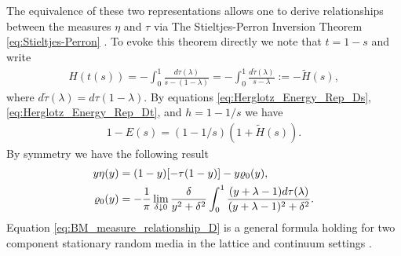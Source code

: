 \documentclass[english,12pt]{ttuthes}
\begin{document}
The equivalence of these two representations allows one to derive
relationships between the measures $\eta$ and $\tau$ via The Stieltjes-Perron
Inversion Theorem \eqref{eq:Stieltjes-Perron}
\cite{Day:JPCM-96,Henrici:1974:v3,MILTON:2002:TC}.
To evoke this theorem directly we note that $t=1-s$ and write
%
\begin{align}\label{eq:Hts}
  H(t(s))=-\int_0^1\frac{d\tau(\lambda)}{s-(1-\lambda)}
         =-\int_0^1\frac{d\tilde{\tau}(\lambda)}{s-\lambda}
         :=-\tilde{H}(s),
\end{align}
%
where $d\tilde{\tau}(\lambda)=d\tau(1-\lambda)$. By equations
\eqref{eq:Herglotz_Energy_Rep_Ds}, \eqref{eq:Herglotz_Energy_Rep_Dt},
and $h=1-1/s$ we have  
%
\begin{align}\label{eq:Es_relationships_D}
  1-E(s)=(1-1/s)(1+\tilde{H}(s)).
\end{align}
%
By symmetry we have the following result
%
\begin{align}\label{eq:BM_measure_relationship_D}
  y\eta(y)&=(1-y)[-\tau(1-y)] - y\varrho_0(y), \\
  \varrho_0(y)&=-\frac{1}{\pi}\lim_{\delta\downarrow 0}\frac{\delta}{y^2+\delta^2}
  \int_0^1\frac{(y+\lambda-1)d\tau(\lambda)}{(y+\lambda-1)^2+\delta^2}.\notag
\end{align}
%
Equation \eqref{eq:BM_measure_relationship_D} is a general formula
holding for two component stationary random media in the lattice and
continuum settings \cite{Golden:PRL-3935}. 
%
\end{document}
